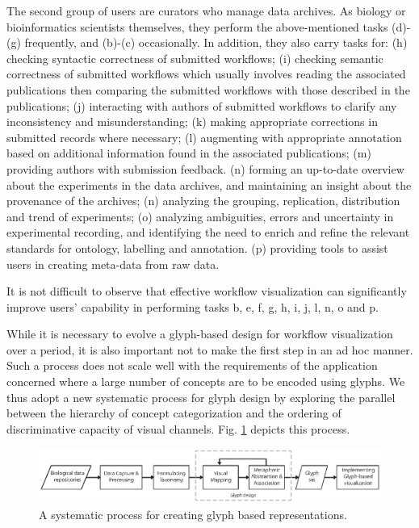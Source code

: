 The second group of users are curators who manage data archives. As biology or bioinformatics scientists themselves, they perform the above-mentioned tasks (d)-(g) frequently, and (b)-(c) occasionally. In addition, they also carry tasks for:
(h) checking syntactic correctness of submitted workflows;
(i) checking semantic correctness of submitted workflows which usually involves reading the associated publications then comparing the submitted workflows with those described in the publications;
(j) interacting with authors of submitted workflows to clarify any inconsistency and misunderstanding;
(k) making appropriate corrections in submitted records where necessary;
(l) augmenting with appropriate annotation based on additional information found in the associated publications;
(m) providing authors with submission feedback.
(n) forming an up-to-date overview about the experiments in the data archives, and maintaining an insight about the provenance of the archives;
(n) analyzing the grouping, replication, distribution and trend of experiments;
(o) analyzing ambiguities, errors and uncertainty in experimental recording, and identifying the need to enrich and refine the relevant standards for ontology, labelling and annotation.
(p) providing tools to assist users in creating meta-data from raw data.

It is not difficult to observe that effective workflow visualization can significantly improve users' capability in performing tasks b, e, f, g, h, i, j, l, n, o and p.

While it is necessary to evolve a glyph-based design for workflow visualization over a period, it is also important not to make the first step in an ad hoc manner. Such a process does not scale well with the requirements of the application concerned where a large
number of concepts are to be encoded using glyphs. We thus adopt a new systematic process for glyph design by exploring the parallel between the hierarchy of concept categorization and the ordering of discriminative capacity of visual channels. Fig. \ref{fig:workflow} depicts this process.

\begin{figure}[t!]
\centering
\includegraphics[scale=0.56]{images/glyph-taxonomy/workflow.eps}
\caption{A systematic process for creating glyph based representations.}
\label{fig:workflow}
\vspace{-10pt}
\end{figure}

